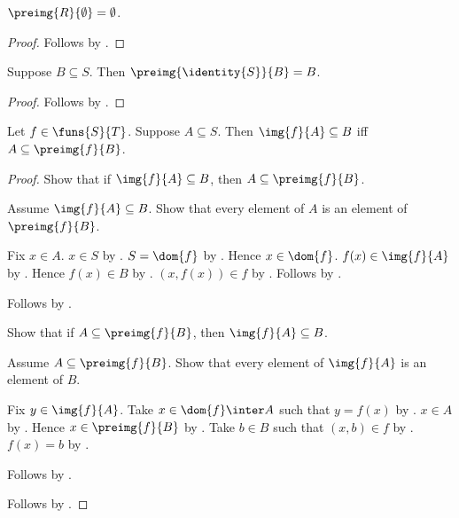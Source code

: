 \begin{proposition}\label{preimage_emptyset}
    $\preimg{R}{\emptyset}=\emptyset$.
\end{proposition}
\begin{proof}
    Follows by .
\end{proof}

\begin{proposition}\label{function_preimage_identity}
    Suppose $B\subseteq S$.
    Then $\preimg{\identity{S}}{B}=B$.
\end{proposition}
\begin{proof}
    Follows by .
\end{proof}

\begin{theorem}\label{image_subseteq_iff_subseteq_preimage}
    Let $f\in\funs{S}{T}$.
    Suppose $A\subseteq S$.
    Then $\img{f}{A}\subseteq B$ iff $A\subseteq\preimg{f}{B}$.
\end{theorem}
\begin{proof}
    Show that if $\img{f}{A}\subseteq B$, then
        $A\subseteq\preimg{f}{B}$.
    \begin{subproof}
        Assume $\img{f}{A}\subseteq B$.
        Show that every element of $A$ is an element of $\preimg{f}{B}$.
        \begin{subproof}
            Fix $x\in A$.
            $x\in S$ by .
            $S=\dom{f}$ by .
            Hence $x\in\dom{f}$.
            $f(x)\in\img{f}{A}$ by
                .
            Hence $f(x)\in B$ by .
            $(x,f(x))\in f$ by
                .
            Follows by .
        \end{subproof}
        Follows by .
    \end{subproof}
    Show that if $A\subseteq\preimg{f}{B}$, then
        $\img{f}{A}\subseteq B$.
    \begin{subproof}
        Assume $A\subseteq\preimg{f}{B}$.
        Show that every element of $\img{f}{A}$ is an element of $B$.
        \begin{subproof}
            Fix $y\in\img{f}{A}$.
            Take $x\in\dom{f}\inter A$ such that $y=f(x)$ by
                .
            $x\in A$ by .
            Hence $x\in\preimg{f}{B}$ by .
            Take $b\in B$ such that $(x,b)\in f$ by .
            $f(x)=b$ by .
        \end{subproof}
        Follows by .
    \end{subproof}
    Follows by \auto.
\end{proof}

